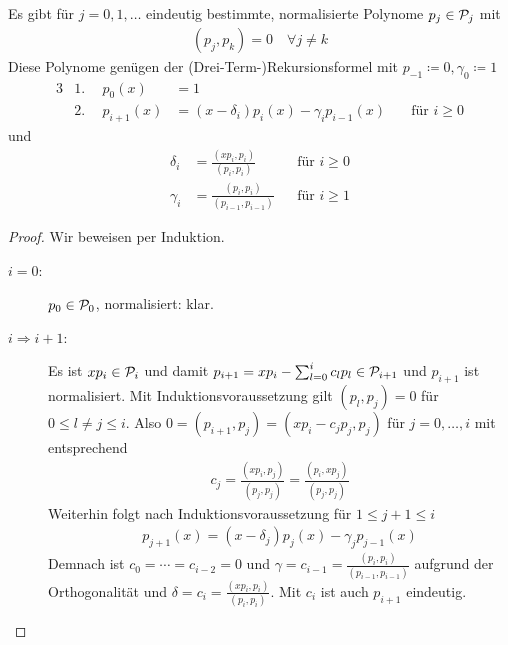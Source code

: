 \begin{Satze}\label{7.4.4}
  Es gibt für $j=0,1,\dotsc$ eindeutig bestimmte, normalisierte
  Polynome $p_j\in\mathcal{P}_j$ mit 
  \begin{gather*}
    (p_j,p_k) =0 \quad \forall j\neq k
  \end{gather*}
  Diese Polynome genügen der (Drei-Term-)Rekursionsformel 
   mit 
  $p_{-1}\coloneqq 0, \gamma_0\coloneqq 1$
  \begin{alignat}{3}
    \nonumber
    &1.~~&p_0(x)&=1 \\
    &2.~~&p_{i+1}(x)&=(x-\delta_i)p_i(x)-\gamma_ip_{i-1}(x)
    &\quad \text{für  }i\geq 0
    \label{VII.4.3} 
  \end{alignat}
  und
  \begin{align}
    \nonumber
    \delta_i &=\frac{(xp_i,p_i)}{(p_i,p_i)}
    &&\text{für }i\geq 0 \\
    \gamma_i &=\frac{(p_i,p_i)}{(p_{i-1},p_{i-1})}
    &&\text{für }i\geq 1
       \label{VII.4.4}     
  \end{align}

  \begin{proof}
    Wir beweisen per Induktion.
    \begin{description}
    \item[$i=0$:] $p_0\in\mathcal{P}_0$, normalisiert: klar.
    \item[$i\Rightarrow i+1$:]  Es ist $xp_i\in\mathcal{P}_i$
      und damit $p_{i+1}=xp_i-\sum_{l=0}^ic_lp_l\in\mathcal{P}_{i+1}$
      und $p_{i+1}$ ist normalisiert.
      Mit Induktionsvoraussetzung gilt $(p_l,p_j)=0$ 
      für $0\leq l\neq j\leq i$. Also 
      $0=(p_{i+1},p_j) = (xp_i-c_jp_j, p_j)$ für $j=0,\dotsc,i$
      mit entsprechend 
      \begin{gather*}
        c_j=\frac{(xp_i,p_j)}{(p_j,p_j)} = \frac{(p_i,xp_j)}{(p_j,p_j)}
      \end{gather*}
      Weiterhin folgt nach Induktionsvoraussetzung für $1\leq j+1\leq i$
      \begin{gather*}
        p_{j+1}(x)=(x-\delta_j)p_j(x) -\gamma_jp_{j-1}(x)
      \end{gather*}
      Demnach ist $c_0=\dotsb=c_{i-2}=0$ und
      $\gamma=c_{i-1}=\frac{(p_i,p_i)}{(p_{i-1},p_{i-1})}$
      aufgrund der Orthogonalität
      und $\delta=c_i=\frac{(xp_i,p_i)}{(p_i,p_i)}$.
      Mit $c_i$ ist auch $p_{i+1}$ eindeutig.
    \end{description}
  \end{proof}
\end{Satze}

